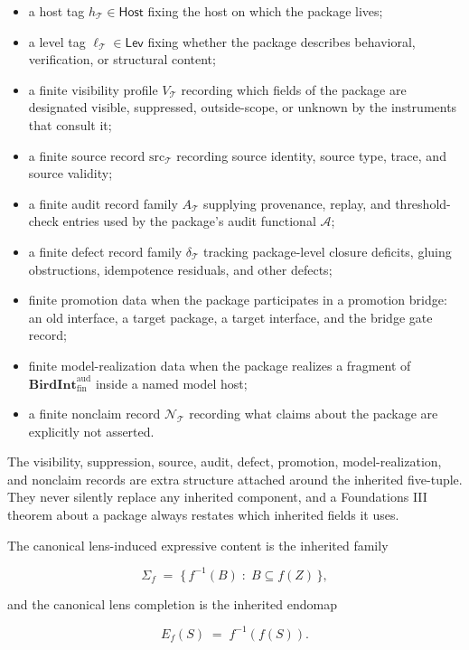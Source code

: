 \documentclass[11pt]{article}
\providecommand{\tightlist}{}
\theoremstyle{definition}
\begin{document}
\begin{itemize}
\tightlist
\item
  a host tag \(h_{\mathcal T}\in\mathsf{Host}\) fixing the host on which the package lives;
\item
  a level tag \(\ell_{\mathcal T}\in\mathsf{Lev}\) fixing whether the package describes behavioral, verification, or structural content;
\item
  a finite visibility profile \(V_{\mathcal T}\) recording which fields of the package are designated visible, suppressed, outside-scope, or unknown by the instruments that consult it;
\item
  a finite source record \(\mathrm{src}_{\mathcal T}\) recording source identity, source type, trace, and source validity;
\item
  a finite audit record family \(A_{\mathcal T}\) supplying provenance, replay, and threshold-check entries used by the package's audit functional \(\mathcal A\);
\item
  a finite defect record family \(\delta_{\mathcal T}\) tracking package-level closure deficits, gluing obstructions, idempotence residuals, and other defects;
\item
  finite promotion data when the package participates in a promotion bridge: an old interface, a target package, a target interface, and the bridge gate record;
\item
  finite model-realization data when the package realizes a fragment of \(\mathbf{BirdInt}^{\mathrm{aud}}_{\mathrm{fin}}\) inside a named model host;
\item
  a finite nonclaim record \(\mathcal N_{\mathcal T}\) recording what claims about the package are explicitly not asserted.
\end{itemize}

The visibility, suppression, source, audit, defect, promotion, model-realization, and nonclaim records are extra structure attached around the inherited five-tuple. They never silently replace any inherited component, and a Foundations III theorem about a package always restates which inherited fields it uses.

The canonical lens-induced expressive content is the inherited family

\[
\Sigma_f \;=\; \{\,f^{-1}(B)\;:\;B\subseteq f(Z)\,\},
\]

and the canonical lens completion is the inherited endomap

\[
E_f(S)\;=\;f^{-1}(f(S)).
\]
\end{document}
